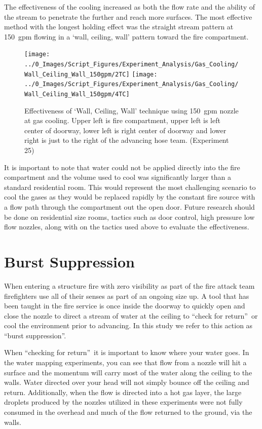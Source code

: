 \documentclass[12pt,oneside]{book}
\begin{document}
The effectiveness of the cooling increased as both the flow rate and the ability of the stream to penetrate the further and reach more surfaces. The most effective method with the longest holding effect was the straight stream pattern at 150~gpm flowing in a `wall, ceiling, wall' pattern toward the fire compartment. 

 \begin{figure}[H]
\centering
\texttt{[image: ../0\_Images/Script\_Figures/Experiment\_Analysis/Gas\_Cooling/Wall\_Ceiling\_Wall\_150gpm/2TC]}
\texttt{[image: ../0\_Images/Script\_Figures/Experiment\_Analysis/Gas\_Cooling/Wall\_Ceiling\_Wall\_150gpm/4TC]}
\caption[Gas Cooling - Straight Stream 150~gpm]{Effectiveness of `Wall, Ceiling, Wall' technique using 150~gpm nozzle at gas cooling. Upper left is fire compartment, upper left is left center of doorway, lower left is right center of doorway and lower right is just to the right of the advancing hose team. (Experiment 25)}
\label{fig:gas_wall_ceiling_wall_150_TC}
\end{figure}

It is important to note that water could not be applied directly into the fire compartment and the volume used to cool was significantly larger than a standard residential room. This would represent the most challenging scenario to cool the gases as they would be replaced rapidly by the constant fire source with a flow path through the compartment out the open door. Future research should be done on residential size rooms, tactics such as door control, high pressure low flow nozzles, along with on the tactics used above to evaluate the effectiveness.  

\section{Burst Suppression} \label{tc:burst_suppression}
When entering a structure fire with zero visibility as part of the fire attack team firefighters use all of their senses as part of an ongoing size up.  A tool that has been taught in the fire service is once inside the doorway to quickly open and close the nozzle to direct a stream of water at the ceiling to \textquotedblleft check for return\textquotedblright \ or cool the environment prior to advancing.   In this study we refer to this action as \textquotedblleft burst suppression\textquotedblright .   

When \textquotedblleft checking for return\textquotedblright \ it is important to know where your water goes.  In the water mapping experiments, you can see that flow from a nozzle will hit a surface and the momentum will carry most of the water along the ceiling to the walls.  Water directed over your head will not simply bounce off the ceiling and return.  Additionally, when the flow is directed into a hot gas layer, the large droplets produced by the nozzles utilized in these experiments were not fully consumed in the overhead and much of the flow returned to the ground, via the walls.  
\end{document}
